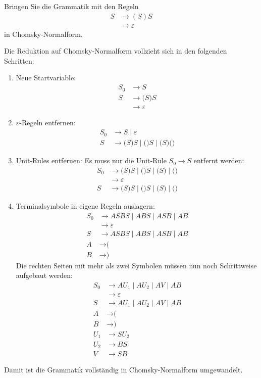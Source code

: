Bringen Sie die Grammatik mit den Regeln
\begin{align*}
S&\rightarrow (S)S
\\
 &\rightarrow \varepsilon
\end{align*}
in Chomsky-Normalform.


\begin{loesung}
Die Reduktion auf Chomsky-Normalform vollzieht sich in den folgenden Schritten:
\begin{enumerate}
\item
Neue Startvariable:
\begin{align*}
S_0&\rightarrow S
\\
S&\rightarrow \texttt{(}S\texttt{)}S
\\
 &\rightarrow \varepsilon
\end{align*}
\item
$\varepsilon$-Regeln entfernen:
\begin{align*}
S_0&\rightarrow S \;|\; \varepsilon
\\
S&\rightarrow \texttt{(}S\texttt{)}S \;|\; \texttt{(}\texttt{)}S \;|\;
  \texttt{(}S\texttt{)} \texttt{(}\texttt{)}
\end{align*}
\item
Unit-Rules entfernen: Es muss nur die Unit-Rule $S_0\to S$ entfernt
werden:
\begin{align*}
S_0& \rightarrow \texttt{(}S)S \;|\; \texttt{(})S \;|\; \texttt{(}S) \;|\;
	\texttt{(})
\\
   &\rightarrow \varepsilon
\\
S&\rightarrow \texttt{(}S\texttt{)}S \;|\; \texttt{(}\texttt{)}S \;|\;
	\texttt{(}S\texttt{)} \;|\; \texttt{(}\texttt{)}
\end{align*}
\item Terminalsymbole in eigene Regeln auslagern:
\begin{align*}
S_0& \rightarrow ASBS \;|\; ABS \;|\; ASB \;|\; AB
\\
   &\rightarrow \varepsilon
\\
S&\rightarrow ASBS \;|\; ABS \;|\; ASB \;|\; AB
\\
A&\rightarrow \texttt{(}
\\
B&\rightarrow \texttt{)}
\end{align*}
Die rechten Seiten mit mehr als zwei Symbolen müssen nun noch Schrittweise
aufgebaut werden:
\begin{align*}
S_0& \rightarrow AU_1 \;|\; AU_2 \;|\; AV \;|\; AB
\\
   &\rightarrow \varepsilon
\\
S&\rightarrow AU_1 \;|\; AU_2 \;|\; AV \;|\; AB
\\
A&\rightarrow \texttt{(}
\\
B&\rightarrow \texttt{)}
\\
U_1&\rightarrow SU_2\\
U_2&\rightarrow BS\\
V  &\rightarrow SB
\end{align*}
\end{enumerate}
Damit ist die Grammatik vollständig in Chomsky-Normalform umgewandelt.
\end{loesung}

